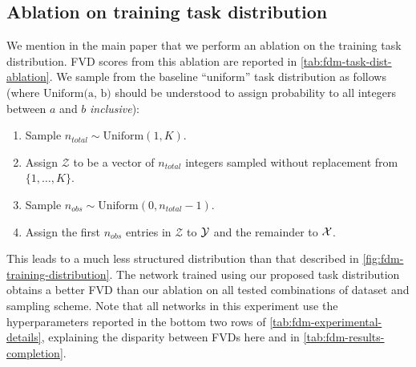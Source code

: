 \subsection{Ablation on training task distribution} \label{ap:fdm-training-task-distribution-ablation}
We mention in the main paper that we perform an ablation on the training task distribution. FVD scores from this ablation are reported in \cref{tab:fdm-task-dist-ablation}.
We sample from the baseline ``uniform'' task distribution as follows (where $\text{Uniform(a, b)}$ should be understood to assign probability to all integers between $a$ and $b$ \textit{inclusive}):
\begin{enumerate}
    \item Sample $n_{total} \sim \text{Uniform}(1, K)$.
    \item Assign $\mathcal{Z}$ to be a vector of $n_{total}$ integers sampled without replacement from $\{1,\ldots,K\}$.
    \item Sample $n_{obs} \sim \text{Uniform}(0, n_{total}-1)$.
    \item Assign the first $n_{obs}$ entries in $\mathcal{Z}$ to $\mathcal{Y}$ and the remainder to $\mathcal{X}$.
\end{enumerate}
This leads to a much less structured distribution than that described in \cref{fig:fdm-training-distribution}. The network trained using our proposed task distribution obtains a better FVD than our ablation on all tested combinations of dataset and sampling scheme. Note that all networks in this experiment use the hyperparameters reported in the bottom two rows of \cref{tab:fdm-experimental-details}, explaining the disparity between FVDs here and in \cref{tab:fdm-results-completion}.
